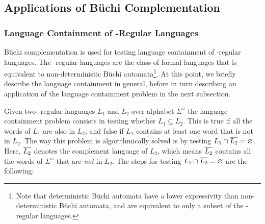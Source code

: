 

\subsection{Applications of Büchi Complementation}

\subsubsection{Language Containment of \om-Regular Languages}

Büchi complementation is used for testing language containment of \om-regular languages. The \om-regular languages are the class of formal languages that is equivalent to non-deterministic Büchi automata\footnote{Note that deterministic Büchi automata have a lower expressivity than non-deterministic Büchi automata, and are equivalent to only a subset of the \om-regular languages.}. At this point, we briefly describe the language containment in general, before in turn describing an application of the language containment problem in the next subsection.

Given two \om-regular languages $L_1$ and $L_2$ over alphabet $\Sigma^\omega$ the language containment problem consists in testing whether $L_1 \subseteq L_2$. This is true if all the words of $L_1$ are also in $L_2$, and false if $L_1$ contains at least one word that is not in $L_2$. The way this problem is algorithmically solved is by testing $L_1 \cap \cl1{L_2} = \varnothing$. Here, $\cl1{L_2}$ denotes the complement language of $L_2$, which means $\cl1{L_2}$ contains all the words of $\Sigma^\omega$ that are \textit{not} in $L_2$. The steps for testing $L_1 \cap \cl1{L_2} = \varnothing$ are the following:

